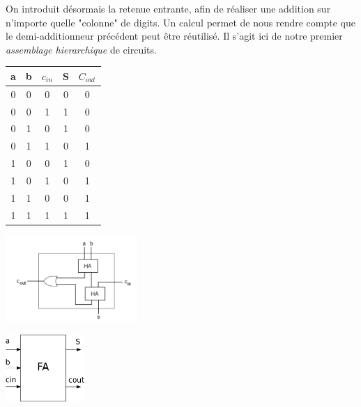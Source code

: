 On introduit désormais la retenue entrante, afin de réaliser une addition sur n'importe quelle "colonne" de digits.
Un calcul permet de nous rendre compte que le demi-additionneur précédent peut être réutilisé. Il s'agit ici de notre premier
{\it assemblage hierarchique} de circuits.

\begin{center}
   \begin{minipage}[t]{4cm}
     \vspace{0pt}
     \centering
     \begin{tabular}{|c|c||c|c|c|}
       \hline
       a & b & $c_{in}$ & S & $C_{out}$ \\ \hline
       0 & 0 &   0 & 0 &         0 \\ \hline
       0 & 0 &   1 & 1 &         0  \\ \hline
       0 & 1 &   0 & 1 &         0  \\ \hline
       0 & 1 &   1 & 0 &         1  \\ \hline
       1 & 0 &   0 & 1 &         0 \\ \hline
       1 & 0 &   1 & 0 &         1  \\ \hline
       1 & 1 &   0 & 0 &         1  \\ \hline
       1 & 1 &   1 & 1 &         1  \\ \hline

     \end{tabular}
   \end{minipage}%
   \begin{minipage}[t]{5cm}
     \vspace{-5pt}
     \centering
     \includegraphics[width=5cm]{./figures/add-5.png}
   \end{minipage}
   \begin{minipage}[t]{5cm}
     \vspace{0pt}
     \centering
     \includegraphics[width=3cm]{./figures/full_adder.png}
   \end{minipage}
\end{center} %

